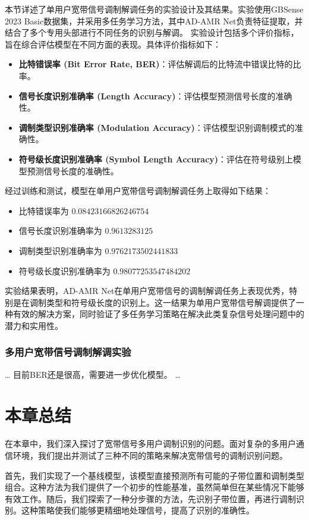 本节详述了单用户宽带信号调制解调任务的实验设计及其结果。实验使用GBSense 2023 Basic数据集，并采用多任务学习方法，其中AD-AMR Net负责特征提取，并结合了多个专用头部进行不同任务的识别与解调。
实验设计包括多个评价指标，旨在综合评估模型在不同方面的表现。具体评价指标如下：
\begin{itemize}
    \item \textbf{比特错误率 (Bit Error Rate, BER)}：评估解调后的比特流中错误比特的比率。
    \item \textbf{信号长度识别准确率 (Length Accuracy)}：评估模型预测信号长度的准确性。
    \item \textbf{调制类型识别准确率 (Modulation Accuracy)}：评估模型识别调制模式的准确性。
    \item \textbf{符号级长度识别准确率 (Symbol Length Accuracy)}：评估在符号级别上模型预测信号长度的准确性。
\end{itemize}

经过训练和测试，模型在单用户宽带信号调制解调任务上取得如下结果：
\begin{itemize}
    \item 比特错误率为 \(0.08423166826246754\)
    \item 信号长度识别准确率为 \(0.9613283125\)
    \item 调制类型识别准确率为 \(0.9762173502441833\)
    \item 符号级长度识别准确率为 \(0.98077253547484202\)
\end{itemize}

实验结果表明，AD-AMR Net在单用户宽带信号的调制解调任务上表现优秀，特别是在调制类型和符号级长度的识别上。这一结果为单用户宽带信号解调提供了一种有效的解决方案，同时验证了多任务学习策略在解决此类复杂信号处理问题中的潜力和实用性。

\subsubsection{多用户宽带信号调制解调实验}
\dots
目前BER还是很高，需要进一步优化模型。
\dots

\section{本章总结}\label{sec:background}
在本章中，我们深入探讨了宽带信号多用户调制识别的问题。面对复杂的多用户通信环境，我们提出并测试了三种不同的策略来解决宽带信号的调制识别问题。

首先，我们实现了一个基线模型，该模型直接预测所有可能的子带位置和调制类型组合。这种方法为我们提供了一个初步的性能基准，虽然简单但在某些情况下能够有效工作。随后，我们探索了一种分步骤的方法，先识别子带位置，再进行调制识别。这种策略使我们能够更精细地处理信号，提高了识别的准确性。


